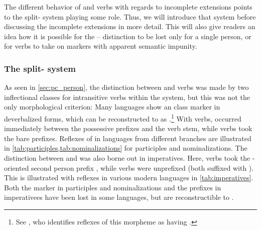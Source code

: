 The different behavior of  and  verbs with regards to incomplete extensions points to the split- system playing some role.
Thus, we will introduce that system before discussing the incomplete extensions in more detail.
This will also give readers an idea how it is possible for the -- distinction to be lost only for a single person, or for  verbs to take on  markers with apparent semantic impunity.



\subsubsection{The \PC split- system}
\label{sec:split}
As seen in \cref{sec:pc_person}, the \PC distinction between  and  verbs was made by two inflectional classes for intransitive verbs within the \setone system, but this was not the only morphological criterion:
%
Many languages show an  class marker in deverbalized forms, which can be reconstructed to \PC as .\footnote{See \textcite[227]{meira2000split}, who identifies reflexes of this morpheme as having .}
With  verbs,  occurred immediately between the possessive prefixes and the verb stem, while  verbs took the bare prefixes.
Reflexes of  in languages from different branches are illustrated in \cref{tab:participles,tab:nominalizations} for participles and nominalizations.%
%
%
%
%
%
The distinction between  and  was also borne out in imperatives.
Here,  verbs took the -oriented second person prefix , while  verbs were unprefixed (both suffixed with ).
This is illustrated with reflexes in various modern languages in \cref{tab:imperatives}.
Both the  marker  in participles and nominalizations and the prefixes in imperativees have been lost in some languages, but are reconstructible to \PC.

